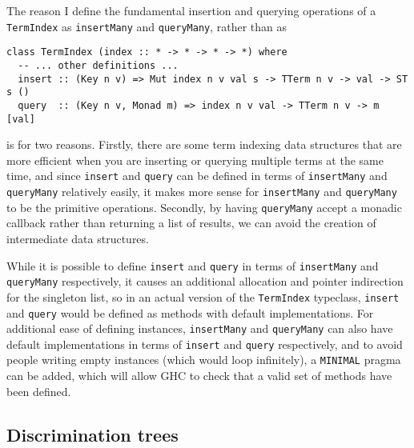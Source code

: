 \documentclass[11pt]{report}
\newcommand{\haskell}[1]{\texttt{#1}}
\begin{document}
The reason I define the fundamental insertion and querying operations of a
\haskell{TermIndex} as \haskell{insertMany} and \haskell{queryMany}, rather
than as

\vspace{-0.5em}
\begin{verbatim}
class TermIndex (index :: * -> * -> * -> *) where
  -- ... other definitions ...
  insert :: (Key n v) => Mut index n v val s -> TTerm n v -> val -> ST s ()
  query  :: (Key n v, Monad m) => index n v val -> TTerm n v -> m [val]
\end{verbatim}
\vspace{0em}

is for two reasons. Firstly, there are some term indexing data structures that
are more efficient when you are inserting or querying multiple terms at the same
time, and since \haskell{insert} and \haskell{query} can be defined in terms of
\haskell{insertMany} and \haskell{queryMany} relatively easily, it makes more
sense for \haskell{insertMany} and \haskell{queryMany} to be the primitive
operations. Secondly, by having \haskell{queryMany} accept a monadic callback
rather than returning a list of results, we can avoid the creation of
intermediate data structures.

While it is possible to define \haskell{insert} and \haskell{query} in terms of
\haskell{insertMany} and \haskell{queryMany} respectively, it causes an
additional allocation and pointer indirection for the singleton list, so in an
actual version of the \haskell{TermIndex} typeclass, \haskell{insert} and
\haskell{query} would be defined as methods with default implementations.
For additional ease of defining instances, \haskell{insertMany} and
\haskell{queryMany} can also have default implementations in terms of
\haskell{insert} and \haskell{query} respectively, and to avoid people writing
empty instances (which would loop infinitely), a \texttt{MINIMAL} pragma can be
added, which will allow GHC to check that a valid set of methods have been
defined.

\subsection{Discrimination trees}
\label{sec:discrimination-trees}
\end{document}
